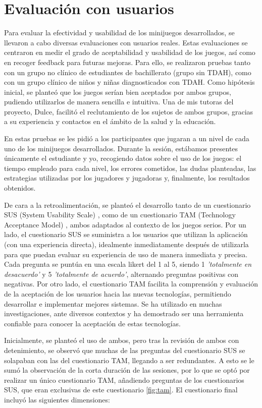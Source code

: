 \section{Evaluación con usuarios}
Para evaluar la efectividad y usabilidad de los minijuegos desarrollados, se llevaron a cabo diversas evaluaciones con usuarios reales.
Estas evaluaciones se centraron en medir el grado de aceptabilidad y usabilidad de los juegos, así como en recoger feedback para futuras mejoras.
Para ello, se realizaron pruebas tanto con un grupo no clínico de estudiantes de bachillerato (grupo sin TDAH), como con un grupo clínico de niños y niñas diagnosticados con TDAH.
Como hipótesis inicial, se planteó que los juegos serían bien aceptados por ambos grupos, pudiendo utilizarlos de manera sencilla e intuitiva.
Una de mis tutoras del proyecto, Dulce, facilitó el reclutamiento de los sujetos de ambos grupos, gracias a su experiencia y contactos en el ámbito de la salud y la educación.

En estas pruebas se les pidió a los participantes que jugaran a un nivel de cada uno de los minijuegos desarrollados.
Durante la sesión, estábamos presentes únicamente el estudiante y yo, recogiendo datos sobre el uso de los juegos: el tiempo empleado para cada nivel, los errores cometidos, las dudas planteadas, las estrategias utilizadas por los jugadores y jugadoras y, finalmente, los resultados obtenidos.

De cara a la retroalimentación, se planteó el desarrollo tanto de un cuestionario SUS (System Usability Scale) \parencite{sus}, como de un cuestionario TAM (Technology Acceptance Model) \parencite{tam}, ambos adaptados al contexto de los juegos serios.
Por un lado, el cuestionario SUS se suministra a los usuarios que utilizan la aplicación (con una experiencia directa), idealmente inmediatamente después de utilizarla para que puedan evaluar su experiencia de uso de manera inmediata y precisa.
Cada pregunta se puntúa en una escala likert del 1 al 5, siendo 1 \textit{'totalmente en desacuerdo'} y 5 \textit{'totalmente de acuerdo'}, alternando preguntas positivas con negativas.
Por otro lado, el cuestionario TAM facilita la comprensión y evaluación de la aceptación de los usuarios hacia las nuevas tecnologías, permitiendo desarrollar e implementar mejores sistemas.
Se ha utilizado en muchas investigaciones, ante diversos contextos y ha demostrado ser una herramienta confiable para conocer la aceptación de estas tecnologías.

Inicialmente, se planteó el uso de ambos, pero tras la revisión de ambos con detenimiento, se observó que muchas de las preguntas del cuestionario SUS se solapaban con las del cuestionario TAM, llegando a ser redundantes.
A esto se le sumó la observación de la corta duración de las sesiones, por lo que se optó por realizar un único cuestionario TAM, añadiendo preguntas de los cuestionarios SUS, que eran exclusivas de este cuestionario \cref{fig:tam}.
El cuestionario final incluyó las siguientes dimensiones:

